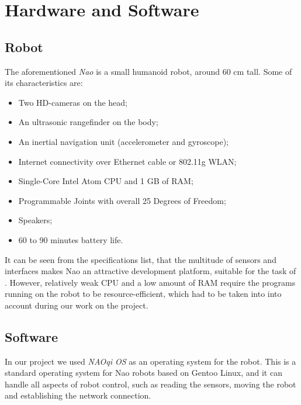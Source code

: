 \chapter{Hardware and Software}

\section{Robot}

The aforementioned \textit{Nao} is a small humanoid robot, around 60 cm tall.
Some of its characteristics are:

\begin{itemize}

\item Two HD-cameras on the head;

\item An ultrasonic rangefinder on the body;

\item An inertial navigation unit (accelerometer and gyroscope);

\item Internet connectivity over Ethernet cable or 802.11g WLAN;

\item Single-Core Intel Atom CPU and 1 GB of RAM;

\item Programmable Joints with overall 25 Degrees of Freedom;

\item Speakers;

\item 60 to 90 minutes battery life.

\end{itemize}

It can be seen from the specifications list, that the multitude of sensors and
interfaces makes Nao an attractive development platform, suitable for the task
of . However, relatively weak CPU and a low amount of RAM require
the programs running on the robot to be resource-efficient, which had to be
taken into into account during our work on the project.

\section{Software}

In our project we used \textit{NAOqi OS} as an operating system for the robot.
This is a standard operating system for Nao robots based on Gentoo Linux, and
it can handle all aspects of robot control, such as reading the sensors, moving
the robot and establishing the network connection.

